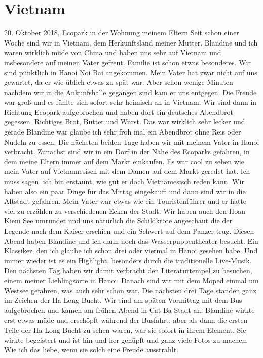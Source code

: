 \documentclass[11pt]{book}
\begin{document}
\chapter{Vietnam}
20. Oktober 2018, Ecopark in der Wohnung meinem Eltern
Seit schon einer Woche sind wir in Vietnam, dem Herkunftsland meiner Mutter. Blandine und ich waren wirklich müde 
von China und haben uns sehr auf Vietnam und insbesondere auf meinen Vater gefreut. Familie ist schon etwas besonderes.
Wir sind pünktlich in Hanoi Noi Bai angekommen. Mein Vater hat zwar nicht auf uns gewartet, da er wie üblich etwas 
zu spät war. Aber schon wenige Minuten nachdem wir in die Ankunfshalle gegangen sind kam er uns entgegen. Die Freude 
war groß und es fühlte sich sofort sehr heimisch an in Vietnam. Wir sind dann in Richtung Ecopark aufgebrochen
und haben dort ein deutsches Abendbrot gegessen. Richtiges Brot, Butter und Wurst. Das war wirklich sehr lecker 
und gerade Blandine war glaube ich sehr froh mal ein Abendbrot ohne Reis oder Nudeln zu essen.
Die nächsten beiden Tage haben wir mit meinem Vater in Hanoi verbracht. Zunächst sind wir in ein Dorf in der 
Nähe des Ecoparks gefahren, in dem meine Eltern immer auf dem Markt einkaufen. Es war cool zu sehen wie mein 
Vater auf Vietnamesisch mit dem Damen auf dem Markt geredet hat. Ich muss sagen, ich bin erstaunt, wie gut er doch 
Vietnamesisch reden kann. Wir haben also ein paar Dinge für das Mittag eingekauft und dann sind wir in die Altstadt gefahren. 
Mein Vater war etwas wie ein Touristenführer und er hatte viel zu erzählen zu verschiedenen Ecken der Stadt. Wir haben 
auch den Hoan Kiem See umrundet und uns natürlich die Schildkröte angeschaut die der Legende nach dem Kaiser erschien 
und ein Schwert auf dem Panzer trug. Diesen Abend haben Blandine und ich dann noch das Wasserpuppentheater besucht.
Ein Klassiker, den ich glaube ich schon drei oder viermal in Hanoi gesehen habe. Und immer wieder ist es ein Highlight,
besonders durch die traditionelle Live-Musik. Den nächsten Tag haben wir damit verbracht den Literaturtempel zu besuchen, 
einem meiner Lieblingsorte in Hanoi. Danach sind wir mit dem Moped einmal um Westsee gefahren, was auch sehr schön war.
Die nächsten drei Tage standen ganz im Zeichen der Ha Long Bucht. Wir sind am späten Vormittag mit dem Bus aufgebrochen 
und kamen am frühen Abend in Cat Ba Stadt an. Blandine wirkte erst etwas müde und erschöpft während der Busfahrt, 
aber als dann die ersten Teile der Ha Long Bucht zu sehen waren, war sie sofort in ihrem Element. Sie wirkte begeistert 
und ist hin und her gehüpft und ganz viele Fotos zu machen. Wie ich das liebe, wenn sie solch eine Freude ausstrahlt.
\end{document}
